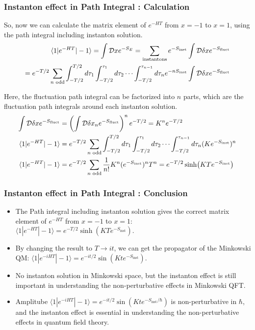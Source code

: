 \documentclass[10pt]{beamer}
\begin{document}
\begin{frame}
    \frametitle{Instanton effect in Path Integral : Calculation}

    So, now we can calculate the matrix element of $e^{-HT}$ from $x = -1$ to $x = 1$, using the path integral including instanton solution.
    \begin{align*}
    \small
    \langle 1 | e^{-HT} | -1 \rangle = \int \mathcal{D}x e^{-S_E} = \sum_{\text{instantons}} e^{-S_{\text{inst}}} \int \mathcal{D}\delta x e^{-S_{\text{fluct}}} \\
    = e^{-T/2} \sum_{n \text{ odd}} \int_{-T/2}^{T/2} d\tau_1 \int_{-T/2}^{\tau_1} d\tau_2 \cdots \int_{-T/2}^{\tau_{n-1}} d\tau_n e^{-nS_{\text{inst}}} \int \mathcal{D}\delta x e^{-S_{\text{fluct}}} 
    \end{align*}


Here, the fluctuation path integral can be factorized into $n$ parts, which are the fluctuation path integrals around each instanton solution.
\begin{align*}
\small
\int \mathcal{D}\delta x e^{-S_{\text{fluct}}} &= \left(\int \mathcal{D}\delta x_n e^{-S_{\text{fluct}}}\right)^n e^{-T/2}= K^n e^{-T/2} \\
    \langle 1 | e^{-HT} | -1 \rangle &= e^{-T/2} \sum_{n \text{ odd}} \int_{-T/2}^{T/2} d\tau_1 \int_{-T/2}^{\tau_1} d\tau_2 \cdots \int_{-T/2}^{\tau_{n-1}} d\tau_n (Ke^{-S_{\text{inst}}})^n \\
    \langle 1 | e^{-HT} | -1 \rangle &=e^{-T/2} \sum_{n \text{ odd}} \frac{1}{n!} K^n(e^{-S_{\text{inst}}})^n T^n = e^{-T/2} \sinh(KTe^{-S_{\text{inst}}}) \\
\end{align*}
\end{frame}

\begin{frame}
\frametitle{Instanton effect in Path Integral : Conclusion}
\begin{itemize}
\item The Path integral including instanton solution gives the correct matrix element of $e^{-HT}$ from $x = -1$ to $x = 1$: $\langle 1 | e^{-HT} | -1 \rangle = e^{-T/2} \sinh(KTe^{-S_{\text{inst}}})$.
\item By changing the result to $T \rightarrow it$, we can get the propagator of the Minkowski QM: $\langle 1 | e^{-iHT} | -1 \rangle = e^{-it/2} \sin(Kte^{-S_{\text{inst}}})$.
\item No instanton solution in Minkowski space, but the instanton effect is still important in understanding the non-perturbative effects in Minkowski QFT.
\item Amplitube $\langle 1 | e^{-iHT} | -1 \rangle = e^{-it/2} \sin(Kte^{-S_{\text{inst}}/\hbar})$ is non-perturbative in $\hbar$, and the instanton effect is essential in understanding the non-perturbative effects in quantum field theory.
\end{itemize}
\end{frame}
\end{document}

